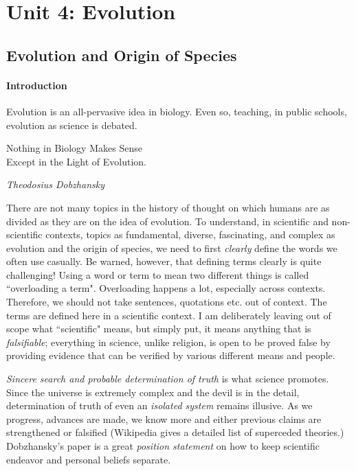 \section{Unit 4: Evolution}
\subsection{Evolution and Origin of Species}
\paragraph{Introduction}
Evolution is an all-pervasive idea in biology. Even so, teaching, in public schools, evolution as science is debated. 
\epigraph{
    Nothing in Biology Makes Sense \\
    Except in the Light of Evolution.
}{
    \textit{Theodosius Dobzhansky \cite{light-of-evol}}
}
\par\bigskip
There are not many topics in the history of thought on which humans are as divided as they are on the idea of evolution. To understand, in scientific and non-scientific contexts, topics as fundamental, diverse, fascinating, and complex as evolution and the origin of species, we need to first \emph{clearly} define the words we often use casually. Be warned, however, that defining terms clearly is quite challenging! Using a word or term to mean two different things is called ``overloading a term". Overloading happens a lot, especially across contexts. Therefore, we should not take sentences, quotations etc. out of context. The terms are defined here in a scientific context. I am deliberately leaving out of scope what ``scientific" means, but simply put, it means anything that is \emph{falsifiable}; everything in science, unlike religion, is open to be proved false by providing evidence that can be verified by various different means and people.
\par\bigskip

\emph{Sincere search and probable determination of truth} is what science promotes. Since the universe is extremely complex and the devil is in the detail, determination of truth of even an \emph{isolated system} remains illusive. As we progress, advances are made, we know more and either previous claims are strengthened or falsified (Wikipedia \cite{superseded} gives a detailed list of superceded theories.) Dobzhansky's paper \cite{light-of-evol} is a great \emph{position statement} on how to keep scientific endeavor and personal beliefs separate.
\par\bigskip

